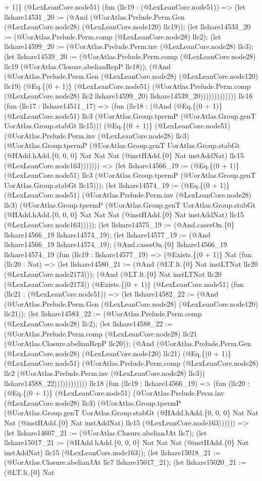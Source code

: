 \documentclass[11pt]{article}
\begin{document}
+ 1)\} (@LexLeanCore.node51) (fun (llc19 : (@LexLeanCore.node51)) => (let llshare14531\_20 := (@And (@UorAtlas.Prelude.Perm.Gen (@LexLeanCore.node28) (@LexLeanCore.node120) llc19)); (let llshare14533\_20 := (@UorAtlas.Prelude.Perm.comp (@LexLeanCore.node28) llc2); (let llshare14599\_20 := (@UorAtlas.Prelude.Perm.inv (@LexLeanCore.node28) llc3); (let llshare14539\_20 := (@UorAtlas.Prelude.Perm.comp (@LexLeanCore.node28) llc19 (@UorAtlas.Closure.abelianRepP llc18)); (@And (@UorAtlas.Prelude.Perm.Gen (@LexLeanCore.node28) (@LexLeanCore.node120) llc19) (@Eq.\{(0 + 1)\} (@LexLeanCore.node51) (@UorAtlas.Prelude.Perm.comp (@LexLeanCore.node28) llc2 llshare14599\_20) llshare14539\_20))))))))))))) llc16 (fun (llc17 : llshare14511\_17) => (fun (llc18 : (@And (@Eq.\{(0 + 1)\} (@LexLeanCore.node51) llc3 (@UorAtlas.Group.tpermP (@UorAtlas.Group.genT UorAtlas.Group.stabGt llc15))) (@Eq.\{(0 + 1)\} (@LexLeanCore.node51) (@UorAtlas.Prelude.Perm.inv (@LexLeanCore.node28) llc3) (@UorAtlas.Group.tpermP (@UorAtlas.Group.genT UorAtlas.Group.stabGt (@HAdd.hAdd.\{0, 0, 0\} Nat Nat Nat (@instHAdd.\{0\} Nat instAddNat) llc15 (@LexLeanCore.node163))))))) => (let llshare14566\_19 := (@Eq.\{(0 + 1)\} (@LexLeanCore.node51) llc3 (@UorAtlas.Group.tpermP (@UorAtlas.Group.genT UorAtlas.Group.stabGt llc15))); (let llshare14574\_19 := (@Eq.\{(0 + 1)\} (@LexLeanCore.node51) (@UorAtlas.Prelude.Perm.inv (@LexLeanCore.node28) llc3) (@UorAtlas.Group.tpermP (@UorAtlas.Group.genT UorAtlas.Group.stabGt (@HAdd.hAdd.\{0, 0, 0\} Nat Nat Nat (@instHAdd.\{0\} Nat instAddNat) llc15 (@LexLeanCore.node163))))); (let llshare14575\_19 := (@And.casesOn.\{0\} llshare14566\_19 llshare14574\_19); (let llshare14577\_19 := (@And llshare14566\_19 llshare14574\_19); (@And.casesOn.\{0\} llshare14566\_19 llshare14574\_19 (fun (llc19 : llshare14577\_19) => (@Exists.\{(0 + 1)\} Nat (fun (llc20 : Nat) => (let llshare14580\_21 := (@And (@LT.lt.\{0\} Nat instLTNat llc20 (@LexLeanCore.node2173))); (@And (@LT.lt.\{0\} Nat instLTNat llc20 (@LexLeanCore.node2173)) (@Exists.\{(0 + 1)\} (@LexLeanCore.node51) (fun (llc21 : (@LexLeanCore.node51)) => (let llshare14582\_22 := (@And (@UorAtlas.Prelude.Perm.Gen (@LexLeanCore.node28) (@LexLeanCore.node120) llc21)); (let llshare14583\_22 := (@UorAtlas.Prelude.Perm.comp (@LexLeanCore.node28) llc2); (let llshare14588\_22 := (@UorAtlas.Prelude.Perm.comp (@LexLeanCore.node28) llc21 (@UorAtlas.Closure.abelianRepP llc20)); (@And (@UorAtlas.Prelude.Perm.Gen (@LexLeanCore.node28) (@LexLeanCore.node120) llc21) (@Eq.\{(0 + 1)\} (@LexLeanCore.node51) (@UorAtlas.Prelude.Perm.comp (@LexLeanCore.node28) llc2 (@UorAtlas.Prelude.Perm.inv (@LexLeanCore.node28) llc3)) llshare14588\_22)))))))))))) llc18 (fun (llc19 : llshare14566\_19) => (fun (llc20 : (@Eq.\{(0 + 1)\} (@LexLeanCore.node51) (@UorAtlas.Prelude.Perm.inv (@LexLeanCore.node28) llc3) (@UorAtlas.Group.tpermP (@UorAtlas.Group.genT UorAtlas.Group.stabGt (@HAdd.hAdd.\{0, 0, 0\} Nat Nat Nat (@instHAdd.\{0\} Nat instAddNat) llc15 (@LexLeanCore.node163)))))) => (let llshare14607\_21 := (@UorAtlas.Closure.abelianJAt llc7); (let llshare15017\_21 := (@HAdd.hAdd.\{0, 0, 0\} Nat Nat Nat (@instHAdd.\{0\} Nat instAddNat) llc15 (@LexLeanCore.node163)); (let llshare15018\_21 := (@UorAtlas.Closure.abelianJAt llc7 llshare15017\_21); (let llshare15020\_21 := (@LT.lt.\{0\} Nat 
\end{document}
